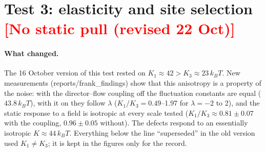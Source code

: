 \documentclass[11pt,a4paper]{article}
\newcommand{\kT}{k_BT}
\newcommand{\verdict}[2]{\textbf{\textcolor{#1}{[#2]}}}
\begin{document}
\section{Test 3: elasticity and site selection \verdict{red}{No static pull (revised 22 Oct)}}

\paragraph{What changed.} The 16 October version of this test rested on $K_1\approx42>K_3\approx23\,\kT$. New measurements (reports/frank\_findings) show
that this anisotropy is a property of the noise: with the director--flow coupling off the fluctuation constants are equal ($43.8\,\kT$), with it on they
follow $\lambda$ ($K_1/K_3=0.49$--1.97 for $\lambda=-2$ to 2), and the static response to a field is isotropic at every scale tested ($K_1/K_3\approx0.81\pm0.07$
with the coupling, $0.96\pm0.05$ without). The defects respond to an essentially isotropic $K\approx44\,\kT$. Everything below the line ``superseded'' in the
old version used $K_1\neq K_3$; it is kept in the figures only for the record.
\end{document}
